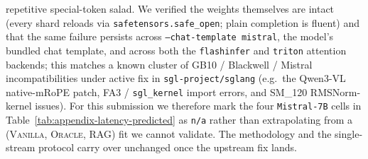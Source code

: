 \begin{itemize}
repetitive special-token salad. We verified the weights themselves are
intact (every shard reloads via \texttt{safetensors.safe\_open}; plain
completion is fluent) and that the same failure persists across
\texttt{--chat-template mistral}, the model's bundled chat template,
and across both the \texttt{flashinfer} and \texttt{triton} attention
backends; this matches a known cluster of GB10 / Blackwell / Mistral
incompatibilities under active fix in \texttt{sgl-project/sglang}
(e.g.\ the Qwen3-VL native-mRoPE patch, FA3 / \texttt{sgl\_kernel}
import errors, and SM\_120 RMSNorm-kernel issues). For this submission
we therefore mark the four \texttt{Mistral-7B} cells in
Table~\ref{tab:appendix-latency-predicted} as \texttt{n/a} rather than
extrapolating from a (\textsc{Vanilla}, \textsc{Oracle},
\textsc{RAG}) fit we cannot validate. The methodology and the
single-stream protocol carry over unchanged once the upstream fix
lands.
\end{itemize}
